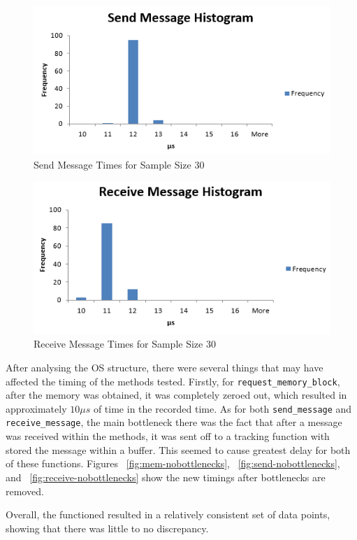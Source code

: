 \documentclass[se]{uw-wkrpt}
\begin{document}
\begin{figure}[bp!]
\centering
\includegraphics[width=120mm]{SendMessageHistogram.PNG}
\caption{Send Message Times for Sample Size 30}
\label{fig:send}
\end{figure}

\begin{figure}[bp!]
\centering
\includegraphics[width=120mm]{ReceiveMessageHistogram.PNG}
\caption{Receive Message Times for Sample Size 30}
\label{fig:receive}
\end{figure}

After analysing the OS structure, there were several things that may have affected the timing of the methods tested. Firstly, for \texttt{request\_memory\_block}, after the memory was obtained, it was completely zeroed out, which resulted in approximately $10\mu s$ of time in the recorded time. As for both \texttt{send\_message} and \texttt{receive\_message}, the main bottleneck there was the fact that after a message was received within the methods, it was sent off to a tracking function with stored the message within a buffer. This seemed to cause greatest delay for both of these functions. Figures ~\ref{fig:mem-nobottlenecks}, ~\ref{fig:send-nobottlenecks}, and ~\ref{fig:receive-nobottlenecks} show the new timings after bottlenecks are removed. 

Overall, the functioned resulted in a relatively consistent set of data points, showing that there was little to no discrepancy.
\end{document}
